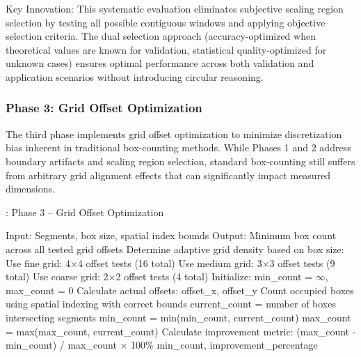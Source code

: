 \documentclass[preprint,12pt]{elsarticle}
\def\textbf#1{#1}%
\begin{document}
\textbf{Key Innovation}: This systematic evaluation eliminates subjective scaling region selection by testing all possible contiguous windows and applying objective selection criteria. The dual selection approach (accuracy-optimized when theoretical values are known for validation, statistical quality-optimized for unknown cases) ensures optimal performance across both validation and application scenarios without introducing circular reasoning.

\subsubsection{Phase 3: Grid Offset Optimization}

The third phase implements grid offset optimization to minimize discretization bias inherent in traditional box-counting methods. While Phases 1 and 2 address boundary artifacts and scaling region selection, standard box-counting still suffers from arbitrary grid alignment effects that can significantly impact measured dimensions.

\begin{algorithm}[H]
\caption{\textbf{: Phase 3} -- Grid Offset Optimization}
\label{alg:phase3}
\begin{algorithmic}[1]
\small
\State \textbf{Input:} Segments, box size, spatial index bounds
\State \textbf{Output:} Minimum box count across all tested grid offsets
\State
\State Determine adaptive grid density based on box size:
    \State Use fine grid: 4×4 offset tests (16 total)
    \State Use medium grid: 3×3 offset tests (9 total)
\Else
    \State Use coarse grid: 2×2 offset tests (4 total)
\EndIf
\State
\State Initialize: min\_count = $\infty$, max\_count = 0
    \State Calculate actual offsets: offset\_x, offset\_y
    \State Count occupied boxes using spatial indexing with correct bounds
    \State current\_count = number of boxes intersecting segments
    \State min\_count = min(min\_count, current\_count)
    \State max\_count = max(max\_count, current\_count)
\EndFor
\State
\State Calculate improvement metric: (max\_count - min\_count) / max\_count × 100\%
\State \Return min\_count, improvement\_percentage
\end{algorithmic}
\end{algorithm}
\end{document}
